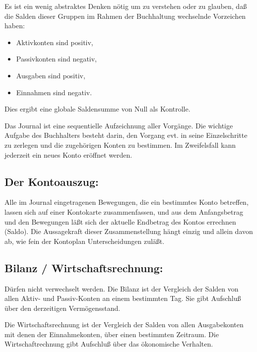 \documentclass[12pt]{report}
\begin{document}
Es ist ein wenig abstraktes Denken nötig um zu verstehen oder zu glauben, daß
die Salden dieser Gruppen im Rahmen der Buchhaltung wechselnde Vorzeichen
haben:

   
\begin{itemize}

\item Aktivkonten sind positiv, 

\item Passivkonten sind negativ,

\item Ausgaben sind positiv,

\item Einnahmen sind negativ.

\end{itemize}

Dies ergibt eine globale Saldensumme von Null als Kontrolle.

Das Journal ist eine sequentielle Aufzeichnung aller Vorgänge. Die wichtige
Aufgabe des Buchhalters besteht darin, den Vorgang evt. in seine Einzelschritte
zu zerlegen und die zugehörigen Konten zu bestimmen. Im Zweifelsfall kann
jederzeit ein neues Konto eröffnet werden.

\subsection{Der Kontoauszug:} 

Alle im Journal eingetragenen Bewegungen, die ein bestimmtes Konto betreffen,
lassen sich auf einer Kontokarte zusammenfassen, und aus dem Anfangsbetrag und
den Bewegungen läßt sich der aktuelle Endbetrag des Kontos errechnen (Saldo).
Die Aussagekraft dieser Zusammenstellung hängt einzig und allein davon ab, wie
fein der Kontoplan Unterscheidungen zuläßt.

\subsection{Bilanz / Wirtschaftsrechnung:} 

Dürfen nicht verwechselt werden.  Die Bilanz ist der Vergleich der Salden von
allen Aktiv- und Passiv-Konten an einem bestimmten Tag. Sie gibt Aufschluß
über den derzeitigen Vermögensstand.

Die Wirtschaftsrechnung ist der Vergleich der Salden von allen Ausgabekonten
mit denen der Einnahmekonten, über einen bestimmten Zeitraum.  Die
Wirtschaftrechnung gibt Aufschluß über das ökonomische Verhalten.
\end{document}
